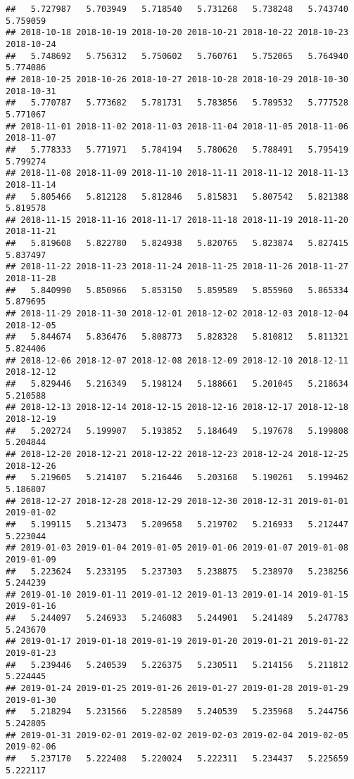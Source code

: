 \documentclass[
]{article}
\begin{document}
\begin{verbatim}
##   5.727987   5.703949   5.718540   5.731268   5.738248   5.743740   5.759059 
## 2018-10-18 2018-10-19 2018-10-20 2018-10-21 2018-10-22 2018-10-23 2018-10-24 
##   5.748692   5.756312   5.750602   5.760761   5.752065   5.764940   5.774086 
## 2018-10-25 2018-10-26 2018-10-27 2018-10-28 2018-10-29 2018-10-30 2018-10-31 
##   5.770787   5.773682   5.781731   5.783856   5.789532   5.777528   5.771067 
## 2018-11-01 2018-11-02 2018-11-03 2018-11-04 2018-11-05 2018-11-06 2018-11-07 
##   5.778333   5.771971   5.784194   5.780620   5.788491   5.795419   5.799274 
## 2018-11-08 2018-11-09 2018-11-10 2018-11-11 2018-11-12 2018-11-13 2018-11-14 
##   5.805466   5.812128   5.812846   5.815831   5.807542   5.821388   5.819578 
## 2018-11-15 2018-11-16 2018-11-17 2018-11-18 2018-11-19 2018-11-20 2018-11-21 
##   5.819608   5.822780   5.824938   5.820765   5.823874   5.827415   5.837497 
## 2018-11-22 2018-11-23 2018-11-24 2018-11-25 2018-11-26 2018-11-27 2018-11-28 
##   5.840990   5.850966   5.853150   5.859589   5.855960   5.865334   5.879695 
## 2018-11-29 2018-11-30 2018-12-01 2018-12-02 2018-12-03 2018-12-04 2018-12-05 
##   5.844674   5.836476   5.808773   5.828328   5.810812   5.811321   5.824406 
## 2018-12-06 2018-12-07 2018-12-08 2018-12-09 2018-12-10 2018-12-11 2018-12-12 
##   5.829446   5.216349   5.198124   5.188661   5.201045   5.218634   5.210588 
## 2018-12-13 2018-12-14 2018-12-15 2018-12-16 2018-12-17 2018-12-18 2018-12-19 
##   5.202724   5.199907   5.193852   5.184649   5.197678   5.199808   5.204844 
## 2018-12-20 2018-12-21 2018-12-22 2018-12-23 2018-12-24 2018-12-25 2018-12-26 
##   5.219605   5.214107   5.216446   5.203168   5.190261   5.199462   5.186807 
## 2018-12-27 2018-12-28 2018-12-29 2018-12-30 2018-12-31 2019-01-01 2019-01-02 
##   5.199115   5.213473   5.209658   5.219702   5.216933   5.212447   5.223044 
## 2019-01-03 2019-01-04 2019-01-05 2019-01-06 2019-01-07 2019-01-08 2019-01-09 
##   5.223624   5.233195   5.237303   5.238875   5.238970   5.238256   5.244239 
## 2019-01-10 2019-01-11 2019-01-12 2019-01-13 2019-01-14 2019-01-15 2019-01-16 
##   5.244097   5.246933   5.246083   5.244901   5.241489   5.247783   5.243670 
## 2019-01-17 2019-01-18 2019-01-19 2019-01-20 2019-01-21 2019-01-22 2019-01-23 
##   5.239446   5.240539   5.226375   5.230511   5.214156   5.211812   5.224445 
## 2019-01-24 2019-01-25 2019-01-26 2019-01-27 2019-01-28 2019-01-29 2019-01-30 
##   5.218294   5.231566   5.228589   5.240539   5.235968   5.244756   5.242805 
## 2019-01-31 2019-02-01 2019-02-02 2019-02-03 2019-02-04 2019-02-05 2019-02-06 
##   5.237170   5.222408   5.220024   5.222311   5.234437   5.225659   5.222117 

\end{verbatim}
\end{document}
